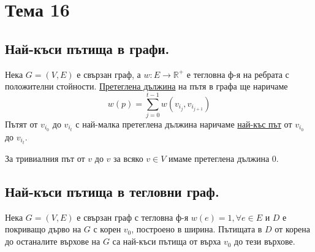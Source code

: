 \section{Тема 16}

\subsection*{Най-къси пътища в графи.}

\begin{definition}
    Нека \(G = (V, E)\) е свързан граф, а \(w: E \to \mathbb{R}^+\) е тегловна ф-я на ребрата с 
    положителни стойности. \underline{Претеглена дължина} на пътя  
    в графа ще наричаме 
    \begin{equation*}
        w(p) = \sum_{j = 0}^{t - 1} w(v_{i_j}, v_{i_{j + 1}})
    \end{equation*}
    Пътят от \(v_{i_0}\) до \(v_{i_t}\) с най-малка претеглена дължина наричаме \underline{най-къс път}
    от \(v_{i_0}\) до \(v_{i_t}\).
\end{definition}

\begin{note}
    За тривиалния път от \(v\) до \(v\) за всяко \(v \in V\) имаме претеглена дължина 0.
\end{note}

\subsection*{Най-къси пътища в тегловни граф.}

\begin{theorem}
    Нека \(G = (V, E)\) е свързан граф с тегловна ф-я \(w(e) = 1, \forall e \in E\) и \(D\) е покриващо 
    дърво на \(G\) с корен \(v_0\), построено в ширина. Пътищата в \(D\) от корена до останалите върхове 
    на \(G\) са най-къси пътища от върха \(v_0\) до тези върхове.
\end{theorem}

